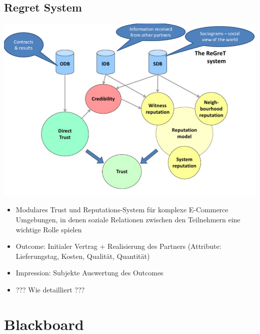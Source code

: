 \documentclass{article} %
\begin{document}
	\subsection{Regret System}
	\begin{center}
		\includegraphics[scale=0.3]{img/regret.png}
	\end{center}
	\begin{itemize}
		\item Modulares Trust und Reputations-System für komplexe E-Commerce Umgebungen, in denen soziale Relationen zwischen den Teilnehmern eine wichtige Rolle spielen
		\item Outcome: Initialer Vertrag + Realisierung des Partners (Attribute: Lieferungstag, Kosten, Qualität, Quantität)
		\item Impression: Subjekte Auswertung des Outcomes
		\item ??? Wie detailliert ???
	\end{itemize}
	\section{Blackboard}
\end{document}
